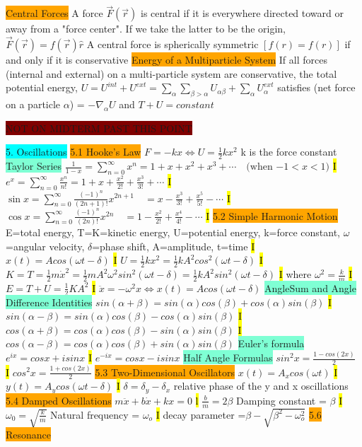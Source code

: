 \documentclass[10pt, oneside]{article}   	%
\begin{document}
\colorbox{Orange}{Central Forces} 
A force $\vec{F}(\vec{r})$ is central if it is everywhere directed toward or away from a "force center". If we take the latter to be the origin, $\vec{F}(\vec{r})=f(\vec{r})\hat{r}$ A central force is spherically symmetric $[f(r)=f(r)]$ if and only if it is conservative 
  \colorbox{Orange}{Energy of a Multiparticle System}
  If all forces (internal and external) on a multi-particle system are conservative, the total potential energy, 
  $U=U^{int}+U^{ext}= \sum_{\alpha}  \sum_{\beta > \alpha} U_{\alpha \beta} +  \sum_{\alpha} U_{\alpha}^{ext}$
  satisfies (net force on a particle $\alpha$) = $-\nabla_{\alpha}U$ and $T+U = constant$








\colorbox{Maroon}{NOT ON MIDTERM PAST THIS POINT}

\colorbox{Cyan}{5. Oscillations}
\colorbox{Orange}{5.1 Hooke's Law}
$F=-kx \Leftrightarrow U = \frac{1}{2}kx^2$ k is the force constant
\colorbox{Aquamarine}{Taylor Series}
$\frac{1}{1-x} = \sum^{\infty}_{n=0} x^n = 1 + x + x^2 + x^3 + \cdots \hspace{1em}(\mbox{when $-1 < x < 1$)}$
\hl{I}
$e^{x} = \sum^{\infty}_{n=0} \frac{x^n}{n!} = 1 + x + \frac{x^2}{2!} + \frac{x^3}{3!} + \cdots$
\hl{I}
$\sin x = \sum^{\infty}_{n=0} \frac{(-1)^n}{(2n+1)!} x^{2n+1}\quad =  x - \frac{x^3}{3!} + \frac{x^5}{5!} - \cdots $
\hl{I}
$\cos x = \sum^{\infty}_{n=0} \frac{(-1)^n}{(2n)!} x^{2n}\quad =  1 - \frac{x^2}{2!} + \frac{x^4}{4!} - \cdots $
\hl{I}
\colorbox{Orange}{5.2 Simple Harmonic Motion}
E=total energy, T=K=kinetic energy, U=potential energy, k=force constant, $\omega$=angular velocity, $\delta$=phase shift, A=amplitude, t=time 
\hl{I}
$x(t) = A cos(\omega t - \delta)$
\hl{I}
$U=\frac{1}{2}kx^2 = \frac{1}{2}kA^2cos^2(\omega t-\delta)$
\hl{I}
$K=T=\frac{1}{2}m\dot{x}^2=\frac{1}{2}mA^2 \omega^2 sin^2(\omega t - \delta) = \frac{1}{2}kA^2 sin^2(\omega t - \delta)  $
\hl{I} 
where $\omega^2 = \frac{k}{m}$
\hl{I}
$E=T+U=\frac{1}{2}KA^2$
\hl{I}
$\ddot{x} = -\omega^2x \Leftrightarrow x(t) = Acos(\omega t-\delta)$
\colorbox{Aquamarine}{AngleSum and Angle Difference Identities}
$sin(\alpha + \beta) = sin(\alpha)cos(\beta) + cos(\alpha)sin(\beta)$
\hl{I}
$sin(\alpha - \beta) = sin(\alpha)cos(\beta) - cos(\alpha)sin(\beta)$
\hl{I}
$cos(\alpha + \beta) = cos(\alpha)cos(\beta) - sin(\alpha)sin(\beta)$
\hl{I}
$cos(\alpha - \beta) = cos(\alpha)cos(\beta) + sin(\alpha)sin(\beta)$
\colorbox{Aquamarine}{Euler's formula}
$e^{ix} = cosx + isinx$
\hl{I}
$e^{-ix} = cosx - isinx$
\colorbox{Aquamarine}{Half Angle Formulas}
$sin^2 x = \frac{1-cos(2x)}{2}$
\hl{I}
$cos^2 x = \frac{1+cos(2x)}{2}$
\colorbox{Orange}{5.3 Two-Dimensional Oscillators}
$x(t)=A_x cos(\omega t)$
\hl{I}
$y(t)=A_y cos(\omega t - \delta)$
\hl{I}
$\delta= \delta_y - \delta_x$ relative phase of the y and x oscillations
\colorbox{Orange}{5.4 Damped Oscillations}
$m\ddot{x}+b\dot{x}+kx=0$
\hl{l}
$\frac{b}{m} = 2\beta$ Damping constant = $\beta$
\hl{I}
$\omega_0 = \sqrt{\frac{k}{m}}$ Natural frequency = $\omega_o$
\hl{I}
decay parameter =$ \beta - \sqrt{\beta^2 - \omega_o^2}$
\colorbox{Orange}{5.6 Resonance}
\end{document}
